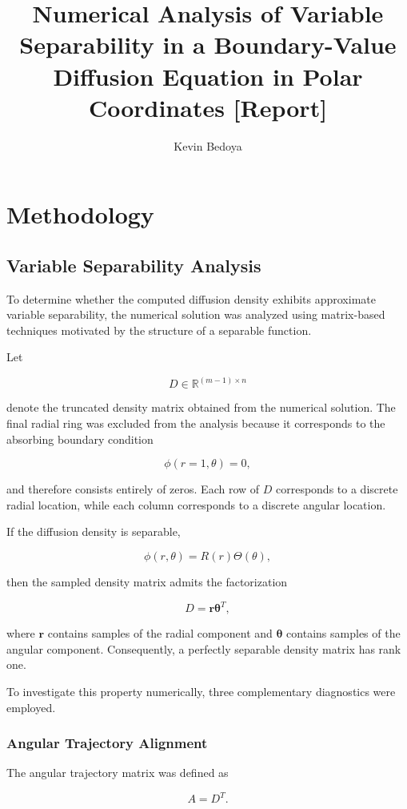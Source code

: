 \documentclass{article}
\title{Numerical Analysis of Variable Separability in a Boundary-Value Diffusion Equation in Polar Coordinates [Report]}
\author{Kevin Bedoya}
\begin{document}
\maketitle

\section{Methodology}

\subsection{Variable Separability Analysis}

To determine whether the computed diffusion density exhibits approximate variable separability, the numerical solution was analyzed using matrix-based techniques motivated by the structure of a separable function.

Let

\[
D \in \mathbb{R}^{(m-1)\times n}
\]

denote the truncated density matrix obtained from the numerical solution. The final radial ring was excluded from the analysis because it corresponds to the absorbing boundary condition

\[
\phi(r=1,\theta)=0,
\]

and therefore consists entirely of zeros. Each row of \(D\) corresponds to a discrete radial location, while each column corresponds to a discrete angular location.

If the diffusion density is separable,

\[
\phi(r,\theta)=R(r)\Theta(\theta),
\]

then the sampled density matrix admits the factorization

\[
D = \mathbf{r}\mathbf{\theta}^{T},
\]

where \(\mathbf r\) contains samples of the radial component and \(\mathbf \theta\) contains samples of the angular component. Consequently, a perfectly separable density matrix has rank one.

To investigate this property numerically, three complementary diagnostics were employed.

\subsubsection{Angular Trajectory Alignment}

The angular trajectory matrix was defined as

\[
A = D^{T}.
\]
\end{document}
